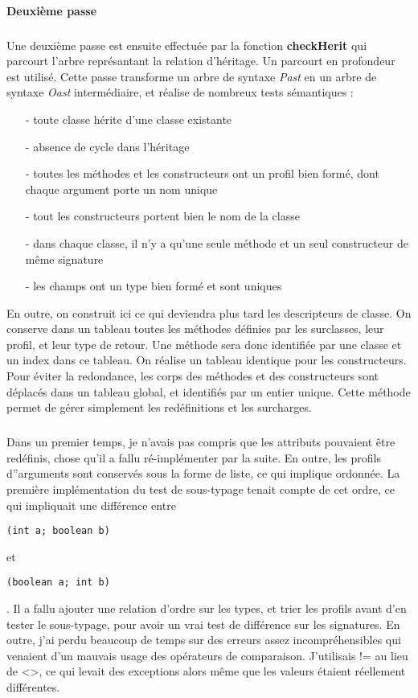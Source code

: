 \documentclass{article}
\begin{document}
\paragraph{Deuxième passe}
\subparagraph*{}
Une deuxième passe est ensuite effectuée par la fonction \textbf{checkHerit} qui parcourt l'arbre représantant la relation d'héritage. Un parcourt en profondeur est utilisé. Cette passe transforme un arbre de syntaxe \emph{Past} en un arbre de syntaxe \emph{Oast} intermédiaire, et réalise de nombreux tests sémantiques :
\begin{itemize} 
  \item[-] toute classe hérite d'une classe existante
  \item[-] absence de cycle dans l'héritage
  \item[-] toutes les méthodes et les constructeurs ont un profil bien formé, dont chaque argument porte un nom unique
  \item[-] tout les constructeurs portent bien le nom de la classe
  \item[-] dans chaque classe, il n'y a qu'une seule méthode et un seul constructeur de même signature
  \item[-] les champs ont un type bien formé et sont uniques
\end{itemize}
En outre, on construit ici ce qui deviendra plus tard les descripteurs de classe. On conserve dans un tableau toutes les méthodes définies par les surclasses, leur profil, et leur type de retour. Une méthode sera donc identifiée par une classe et un index dans ce tableau. On réalise un tableau identique pour les constructeurs. Pour éviter la redondance, les corps des méthodes et des constructeurs sont déplacés dans un tableau global, et identifiés par un entier unique. Cette méthode permet de gérer simplement les redéfinitions et les surcharges. 
\subparagraph*{}
Dans un premier temps, je n'avais pas compris que les attributs pouvaient
être redéfinis, chose qu'il a fallu ré-implémenter par la suite. En outre, les profils d''arguments sont conservés sous la forme de liste, ce qui implique ordonnée. La première implémentation du test de sous-typage tenait compte de cet ordre, ce qui impliquait  une différence entre \begin{verbatim}(int a; boolean b)\end{verbatim} et \begin{verbatim}(boolean a; int b)\end{verbatim}. Il a fallu ajouter une relation d'ordre sur les types, et trier les profils avant d'en tester le sous-typage, pour avoir un vrai test de différence sur les signatures. En outre, j'ai perdu beaucoup de temps sur des erreurs assez incompréhensibles qui venaient d'un mauvais usage des opérateurs de comparaison. J'utilisais != au lieu de <>, ce qui levait des exceptions alors même que les valeurs étaient réellement différentes.
\end{document}
